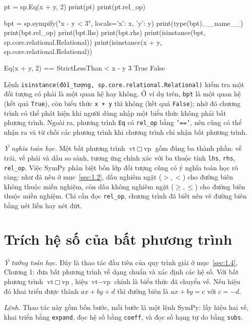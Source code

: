 \documentclass[12pt,a4paper]{report}
\begin{document}
\begin{madoanbox}
pt = sp.Eq(x + y, 2)
print(pt)
print(pt.rel_op)

bpt = sp.sympify("x - y < 3", locals={'x': x, 'y': y})
print(type(bpt).__name__)
print(bpt.rel_op)
print(bpt.lhs)
print(bpt.rhs)
print(isinstance(bpt, sp.core.relational.Relational))
print(isinstance(x + y, sp.core.relational.Relational))
\end{madoanbox}

\begin{ketquabox}
Eq(x + y, 2)
==
StrictLessThan
<
x - y
3
True
False
\end{ketquabox}

Lệnh \texttt{isinstance(đối\_tượng, sp.core.relational.Relational)} kiểm tra một đối tượng có phải là một quan hệ hay không. Ở ví dụ trên, \texttt{bpt} là một quan hệ (kết quả \texttt{True}), còn biểu thức \texttt{x + y} thì không (kết quả \texttt{False}); nhờ đó chương trình có thể phát hiện khi người dùng nhập một biểu thức không phải bất phương trình. Ngoài ra, phương trình \texttt{Eq} có \texttt{rel\_op} bằng \texttt{'=='}, nên cũng có thể nhận ra và từ chối các phương trình khi chương trình chỉ nhận bất phương trình.

\textit{Ý nghĩa toán học.} Một bất phương trình $\text{vt}\ \Box\ \text{vp}$ gồm đúng ba thành phần: vế trái, vế phải và dấu so sánh, tương ứng chính xác với ba thuộc tính \texttt{lhs}, \texttt{rhs}, \texttt{rel\_op}. Việc SymPy phân biệt bốn lớp đối tượng cũng có ý nghĩa toán học rõ ràng: như đã nêu ở mục~\ref*{sec:1.2}, dấu nghiêm ngặt ($>,<$) cho đường biên không thuộc miền nghiệm, còn dấu không nghiêm ngặt ($\ge,\le$) cho đường biên thuộc miền nghiệm. Chỉ cần đọc \texttt{rel\_op}, chương trình đã biết nên vẽ đường biên bằng nét liền hay nét đứt.

\section{Trích hệ số của bất phương trình}
\label{sec:2.7}

\textit{Ý tưởng toán học.} Đây là thao tác đầu tiên của quy trình giải ở mục~\ref*{sec:1.4}, Chương 1: đưa bất phương trình về dạng chuẩn và xác định các hệ số. Với bất phương trình $\text{vt}\ \Box\ \text{vp}$, hiệu $\text{vt}-\text{vp}$ chính là biểu thức đã chuyển vế. Nếu hiệu đó khai triển được thành $ax+by+d$ thì đường biên là $ax+by=c$ với $c=-d$.

\textit{Lệnh.} Thao tác này gồm bốn bước, mỗi bước là một lệnh SymPy: lấy hiệu hai vế, khai triển bằng \texttt{expand}, đọc hệ số bằng \texttt{coeff}, và đọc số hạng tự do bằng \texttt{subs}.
\end{document}
